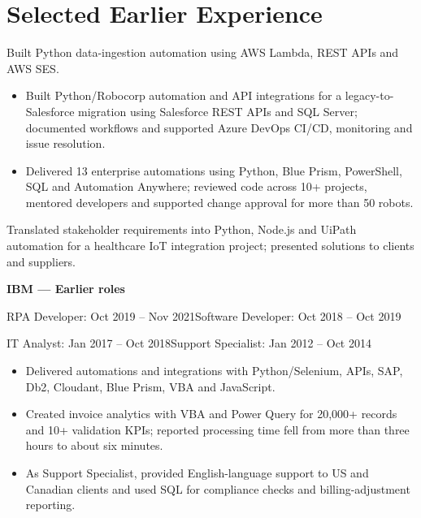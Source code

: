 \ifdatascience
  \researchwork
  \currentwork
\else
  \currentwork
  \researchwork
\fi
\newpage
\selectedprojects
\teachingwork
\section{Selected Earlier Experience}
Built Python data-ingestion automation using AWS Lambda, REST APIs and AWS SES.\par
\vspace{4pt}
\begin{itemize}
  \item Built Python/Robocorp automation and API integrations for a legacy-to-Salesforce migration using Salesforce REST APIs and SQL Server; documented workflows and supported Azure DevOps CI/CD, monitoring and issue resolution.
\end{itemize}
\vspace{2pt}
\begin{itemize}
  \item Delivered 13 enterprise automations using Python, Blue Prism, PowerShell, SQL and Automation Anywhere; reviewed code across 10+ projects, mentored developers and supported change approval for more than 50 robots.
\end{itemize}
\vspace{2pt}
Translated stakeholder requirements into Python, Node.js and UiPath automation for a healthcare IoT integration project; presented solutions to clients and suppliers.\par
\vspace{4pt}
\textbf{IBM --- Earlier roles}\par
{\small RPA Developer: Oct 2019 -- Nov 2021\quad\textbar\quad Software Developer: Oct 2018 -- Oct 2019}\par
{\small IT Analyst: Jan 2017 -- Oct 2018\quad\textbar\quad Support Specialist: Jan 2012 -- Oct 2014}\par
\begin{itemize}
  \item Delivered automations and integrations with Python/Selenium, APIs, SAP, Db2, Cloudant, Blue Prism, VBA and JavaScript.
  \item Created invoice analytics with VBA and Power Query for 20,000+ records and 10+ validation KPIs; reported processing time fell from more than three hours to about six minutes.
  \item As Support Specialist, provided English-language support to US and Canadian clients and used SQL for compliance checks and billing-adjustment reporting.
\end{itemize}

